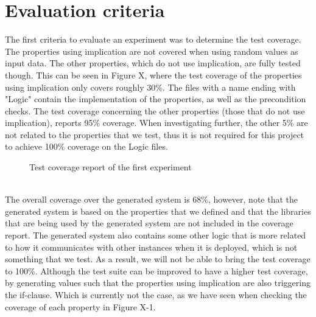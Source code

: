 \section{Evaluation criteria}
The first criteria to evaluate an experiment was to determine the test coverage. The properties using implication are not covered when using random values as input data. The other properties, which do not use implication, are fully tested though. This can be seen in Figure X, where the test coverage of the properties using implication only covers roughly 30\%. The files with a name ending with "Logic" contain the implementation of the properties, as well as the precondition checks. The test coverage concerning the other properties (those that do not use implication), reports 95\% coverage. When investigating further, the other 5\% are not related to the properties that we test, thus it is not required for this project to achieve 100\% coverage on the Logic files.\\
\begin{figure}[h!]
\caption{Test coverage report of the first experiment}
\label{fig:ch5_eval_experiment1}
\centering
\end{figure}
\\
The overall coverage over the generated system is 68\%, however, note that the generated system is based on the properties that we defined and that the libraries that are being used by the generated system are not included in the coverage report. The generated system also contains some other logic that is more related to how it communicates with other instances when it is deployed, which is not something that we test. As a result, we will not be able to bring the test coverage to 100\%. Although the test suite can be improved to have a higher test coverage, by generating values such that the properties using implication are also triggering the if-clause. Which is currently not the case, as we have seen when checking the coverage of each property in Figure X-1.\\

